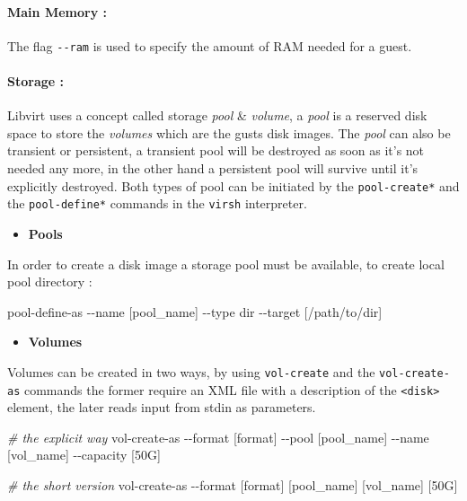 \documentclass[
  14pt,
  english,
  a4paper,
]{scrreprt}
\newenvironment{Shaded}{}{}
\newcommand{\CommentTok}[1]{\textcolor[rgb]{0.38,0.63,0.69}{\textit{#1}}}
\newcommand{\ExtensionTok}[1]{#1}
\newcommand{\NormalTok}[1]{#1}
\providecommand{\tightlist}{%
  \setlength{\itemsep}{0pt}\setlength{\parskip}{0pt}}
\begin{document}
\hypertarget{main-memory-1}{%
\paragraph{Main Memory :}\label{main-memory-1}}

The flag \texttt{-\/-ram} is used to specify the amount of RAM needed
for a guest.

\hypertarget{storage-1}{%
\paragraph{Storage :}\label{storage-1}}

Libvirt uses a concept called storage \emph{pool} \& \emph{volume}, a
\emph{pool} is a reserved disk space to store the \emph{volumes} which
are the gusts disk images. The \emph{pool} can also be transient or
persistent, a transient pool will be destroyed as soon as it's not
needed any more, in the other hand a persistent pool will survive until
it's explicitly destroyed. Both types of pool can be initiated by the
\texttt{pool-create*} and the \texttt{pool-define*} commands in the
\texttt{virsh} interpreter.

\begin{itemize}
\tightlist
\item
  \textbf{Pools}
\end{itemize}

In order to create a disk image a storage pool must be available, to
create local pool directory :

\begin{Shaded}
\begin{Highlighting}[]
\ExtensionTok{pool{-}define{-}as}\NormalTok{ {-}{-}name [pool\_name] {-}{-}type dir {-}{-}target [/path/to/dir]}
\end{Highlighting}
\end{Shaded}

\begin{itemize}
\tightlist
\item
  \textbf{Volumes}
\end{itemize}

Volumes can be created in two ways, by using \texttt{vol-create} and the
\texttt{vol-create-as} commands the former require an XML file with a
description of the \texttt{\textless{}disk\textgreater{}} element, the
later reads input from stdin as parameters.

\begin{Shaded}
\begin{Highlighting}[]
\CommentTok{\# the explicit way}
\ExtensionTok{vol{-}create{-}as}\NormalTok{ {-}{-}format [format] {-}{-}pool [pool\_name] {-}{-}name [vol\_name] {-}{-}capacity [50G]}

\CommentTok{\# the short version}
\ExtensionTok{vol{-}create{-}as}\NormalTok{ {-}{-}format [format] [pool\_name] [vol\_name] [50G]}
\end{Highlighting}
\end{Shaded}
\end{document}
